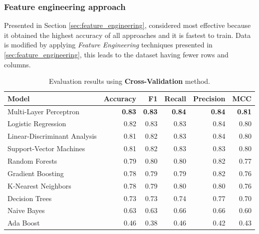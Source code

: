             \subsubsection{Feature engineering approach}
                
                Presented in Section \ref{sec:feature_engineering}, considered most effective because it obtained the highest accuracy of all approaches and it is fastest to train. Data is modified by applying \textit{Feature Engineering} techniques presented in \ref{sec:feature_engineering}, this leads to the dataset having fewer rows and columns.
            
            \begin{table}[htbp]
                \centering
                \caption{Evaluation results using \textbf{Cross-Validation} method.}
                \label{tab:feature_engineering_approach_cv}
                \begin{tabular}{lrrrrr}
                    \toprule
                    \textbf{Model} & \textbf{Accuracy} & \textbf{F1} & \textbf{Recall} & \textbf{Precision} & \textbf{MCC} \\
                    \midrule
                    Multi-Layer Perceptron & \textbf{0.83} & \textbf{0.83} & \textbf{0.84} & \textbf{0.84} & \textbf{0.81} \\
                    Logistic Regression & 0.82 & 0.83 & 0.83 & 0.84 & 0.80 \\
                    Linear-Discriminant Analysis & 0.81 & 0.82 & 0.83 & 0.84 & 0.80 \\
                    Support-Vector Machines & 0.81 & 0.82 & 0.83 & 0.83 & 0.80 \\
                    Random Forests & 0.79 & 0.80 & 0.80 & 0.82 & 0.77 \\
                    Gradient Boosting & 0.78 & 0.79 & 0.79 & 0.82 & 0.76 \\
                    K-Nearest Neighbors & 0.78 & 0.79 & 0.80 & 0.80 & 0.76 \\
                    Decision Trees & 0.73 & 0.73 & 0.74 & 0.77 & 0.70 \\
                    Naive Bayes & 0.63 & 0.63 & 0.66 & 0.66 & 0.60 \\
                    Ada Boost & 0.46 & 0.38 & 0.46 & 0.42 & 0.43 \\
                    \bottomrule
                \end{tabular}
            \end{table}

